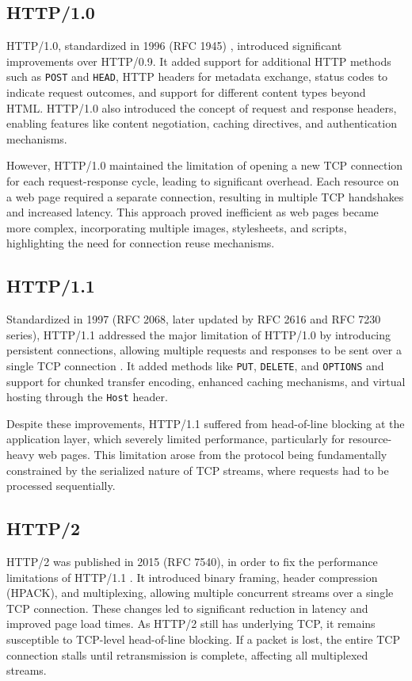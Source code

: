 \subsection{HTTP/1.0}

HTTP/1.0, standardized in 1996 (RFC 1945) \cite{kurose2017}, introduced significant improvements over HTTP/0.9. It added support for additional HTTP methods such as \texttt{POST} and \texttt{HEAD}, HTTP headers for metadata exchange, status codes to indicate request outcomes, and support for different content types beyond HTML. HTTP/1.0 also introduced the concept of request and response headers, enabling features like content negotiation, caching directives, and authentication mechanisms.

However, HTTP/1.0 maintained the limitation of opening a new TCP connection for each request-response cycle, leading to significant overhead. Each resource on a web page required a separate connection, resulting in multiple TCP handshakes and increased latency. This approach proved inefficient as web pages became more complex, incorporating multiple images, stylesheets, and scripts, highlighting the need for connection reuse mechanisms.

\subsection{HTTP/1.1}

Standardized in 1997 (RFC 2068, later updated by RFC 2616 and RFC 7230 series), HTTP/1.1 addressed the major limitation of HTTP/1.0 by introducing persistent connections, allowing multiple requests and responses to be sent over a single TCP connection \cite{kurose2017}. It added methods like \texttt{PUT}, \texttt{DELETE}, and \texttt{OPTIONS} and support for chunked transfer encoding, enhanced caching mechanisms, and virtual hosting through the \texttt{Host} header.

Despite these improvements, HTTP/1.1 suffered from head-of-line blocking at the application layer, which severely limited performance, particularly for resource-heavy web pages. This limitation arose from the protocol being fundamentally constrained by the serialized nature of TCP streams, where requests had to be processed sequentially.

\subsection{HTTP/2}

HTTP/2 was published in 2015 (RFC 7540), in order to fix the performance limitations of HTTP/1.1 \cite{rfc7540}. It introduced binary framing, header compression (HPACK), and multiplexing, allowing multiple concurrent streams over a single TCP connection. These changes led to significant reduction in latency and improved page load times. As HTTP/2 still has underlying TCP, it remains susceptible to TCP-level head-of-line blocking. If a packet is lost, the entire TCP connection stalls until retransmission is complete, affecting all multiplexed streams.

